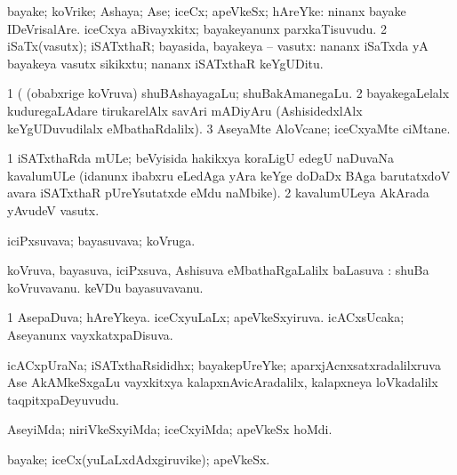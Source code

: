 \bentry
{} 
\gl{\nA}
\bmng
\bnum
{} 
\banum
{} bayake; koVrike; Ashaya; Ase; iceCx; apeVkeSx; hAreYke:  ninanx bayake IDeVrisalAre. 
 iceCxya aBivayxkitx; bayakeyanunx parxkaTisuvudu. 
\eanum
\numie
\num{2} iSaTx(vasutx); iSATxthaR; bayasida, bayakeya -- vasutx:  nananx iSaTxda yA bayakeya vasutx sikikxtu; nananx iSATxthaR keYgUDitu. 
\enum
\emng

\noindent 
\gl{\pagu}
\bmng
\bnum
\num{1}  (  (obabxrige koVruva) shuBAshayagaLu; shuBakAmanegaLu. 
\num{2}  bayakegaLelalx kuduregaLAdare tirukarelAlx savAri mADiyAru (AshisidedxlAlx keYgUDuvudilalx eMbathaRdalilx). 
\num{3}  AseyaMte AloVcane; iceCxyaMte ciMtane. 
\enum
\emng
\eentry

\bentry 
{}
\gl{\nA}
\bmng
\bnum
\num{1} iSATxthaRda mULe; beVyisida hakikxya koraLigU edegU naDuvaNa kavalumULe (idanunx ibabxru eLedAga yAra keYge doDaDx BAga barutatxdoV avara iSATxthaR pUreYsutatxde eMdu naMbike). 
\num{2} kavalumULeya AkArada yAvudeV vasutx. 
\enum
\emng
\eentry

\bentry
{}
\gl{\nA}
\bmng
iciPxsuvava; bayasuvava; koVruga. 
\emng
\eentry

\bentry
{}
\gl{\sapUpa}
\bmng
koVruva, bayasuva, iciPxsuva, Ashisuva eMbathaRgaLalilx baLasuva \saupa:  shuBa koVruvavanu.  keVDu bayasuvavanu. 
\emng
\eentry

\bentry
{} 
\gl{\gu}
\expl{}
\bmng
\bnum
\num{1} AsepaDuva; hAreYkeya. 
\banum
{} iceCxyuLaLx; apeVkeSxyiruva. 
 icACxsUcaka; Aseyanunx vayxkatxpaDisuva. 
\eanum
\numie
\enum
\emng
\eentry

\bentry
{} 
\gl{\nA}
\bmng
icACxpUraNa; iSATxthaRsididhx; bayakepUreYke; aparxjAcnxsatxradalilxruva Ase AkAMkeSxgaLu vayxkitxya kalapxnAvicAradalilx, kalapxneya loVkadalilx taqpitxpaDeyuvudu. 
\emng
\eentry

\bentry
{} 
\gl{\kirxvi}
\expl{}
\bmng
AseyiMda; niriVkeSxyiMda; iceCxyiMda; apeVkeSx hoMdi. 
\emng
\eentry

\bentry
{} 
\gl{\nA}
\expl{}
\bmng
bayake; iceCx(yuLaLxdAdxgiruvike); apeVkeSx. 
\emng
\eentry

